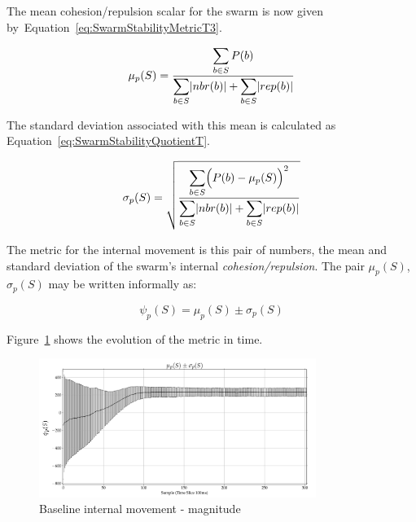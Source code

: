 \documentclass{ieeeaccess}
\begin{document}
The mean cohesion/repulsion scalar for the swarm is now given by~Equation~\ref{eq:SwarmStabilityMetricT3}.  

\begin{equation}
\label{eq:SwarmStabilityMetricT3}
\mu_p(S) = \frac{\mathlarger{\sum_{b \in S} P(b)}}{\mathlarger{\sum_{b \in S}}|nbr(b)| + \mathlarger{\sum_{b \in S}}|rep(b)|}
\end{equation}


The standard deviation associated with this mean is calculated as Equation~\ref{eq:SwarmStabilityQuotientT}.

\begin{equation}
\label{eq:SwarmStabilityQuotientT}
\sigma_p(S) = \sqrt{\frac{\mathlarger{\sum_{b \in S}}\Big(P(b)-\mu_p(S)\Big)^2}{\mathlarger{\sum_{b \in S}}|nbr(b)| + \mathlarger{\sum_{b \in S}}|rep(b)|}}
\end{equation}

The metric for the internal movement is this pair of numbers, the mean and standard deviation of the swarm's internal \emph{cohesion/repulsion}. The pair $\mu_p(S)$, $\sigma_p(S)$ may be written informally as: 

\begin{equation}
\label{eq:SwarmPotentialMagnitude}
\psi_p(S) = \mu_p(S)\pm \sigma_p(S)
\end{equation}

Figure~\ref{coord:BaselineMagnitude1} shows the evolution of the metric in time.

\begin{figure}[H]
\begin{center}
\includegraphics[width=9cm]{figures/BaselineMagnitude1}
\end{center}
\caption{Baseline internal movement - magnitude\label{coord:BaselineMagnitude1}}
\end{figure}
\end{document}

